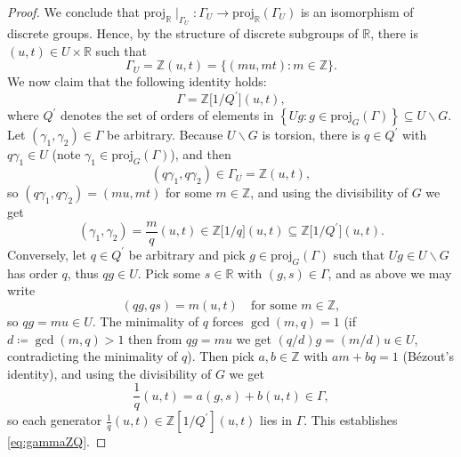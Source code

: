 \documentclass[10pt,a4paper]{amsart}
\begin{document}
\begin{proof}
We conclude that \(\mathrm{proj}_{\mathbb{R}}\mid_{\Gamma_{U}}:\Gamma_{U}\to\mathrm{proj}_{\mathbb{R}}\left(\Gamma_{U}\right)\) is an isomorphism of discrete groups. Hence, by the structure of discrete subgroups of \(\mathbb{R}\), there is \(\left(u,t\right)\in U\times\mathbb{R}\) such that
\[
\Gamma_{U}=\mathbb{Z}\left(u,t\right)=\bigl\{(mu,mt):m\in\mathbb{Z}\bigr\}.
\]
We now claim that the following identity holds:
\begin{equation}\label{eq:gammaZQ}
\Gamma=\mathbb{Z}\big[1/Q^{\prime}\big]\left(u,t\right),
\end{equation}
where \(Q^{\prime}\) denotes the set of orders of elements in \(\left\{Ug:g\in\mathrm{proj}_{G}\left(\Gamma\right)\right\}\subseteq U\backslash G\). Let \((\gamma_{1},\gamma_{2})\in\Gamma\) be arbitrary. Because \(U\backslash G\) is torsion, there is \(q\in Q^{\prime}\) with \(q\gamma_{1}\in U\) (note \(\gamma_{1}\in\mathrm{proj}_{G}\left(\Gamma\right)\)), and then
\[\left(q\gamma_{1},q\gamma_{2}\right)\in\Gamma_{U}=\mathbb{Z}\left(u,t\right),\]
so \(\left(q\gamma_{1},q\gamma_{2}\right)=\left(mu,mt\right)\) for some \(m\in\mathbb{Z}\), and using the divisibility of \(G\) we get
\[\left(\gamma_{1},\gamma_{2}\right)=\frac{m}{q}\left(u,t\right)\in\mathbb{Z}\big[1/q\big]\left(u,t\right)\subseteq\mathbb{Z}\big[1/Q^{\prime}\big]\left(u,t\right).\]
Conversely, let \(q\in Q^{\prime}\) be arbitrary and pick \(g\in\mathrm{proj}_{G}\left(\Gamma\right)\) such that \(Ug\in U\backslash G\) has order \(q\), thus \(qg\in U\). Pick some \(s\in\mathbb{R}\) with \(\left(g,s\right)\in\Gamma\), and as above we may write
\[\left(qg,qs\right)=m\left(u,t\right)\quad\text{for some }m\in\mathbb{Z},\]
so \(qg=mu\in U\). The minimality of \(q\) forces \(\gcd\left(m,q\right)=1\) (if \(d\coloneqq\gcd\left(m,q\right)>1\) then from \(qg=mu\) we get \(\left(q/d\right)g=\left(m/d\right)u\in U\), contradicting the minimality of \(q\)). Then pick \(a,b\in\mathbb{Z}\) with \(am+bq=1\) (B\'{e}zout's identity), and using the divisibility of \(G\) we get
\[\frac{1}{q}\left(u,t\right)=a\left(g,s\right)+b\left(u,t\right)\in\Gamma,\]
so each generator \(\frac{1}{q}\left(u,t\right)\in\mathbb{Z}\left[1/Q^{\prime}\right]\left(u,t\right)\) lies in \(\Gamma\). This establishes \eqref{eq:gammaZQ}.


\end{proof}
\end{document}
